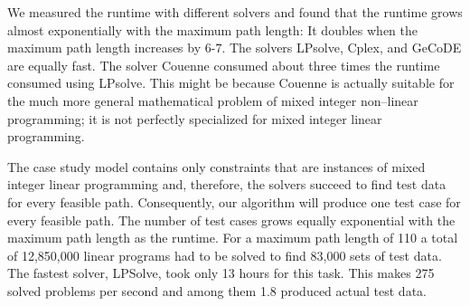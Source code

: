 \documentclass[runningheads,a4paper]{llncs}%
\begin{document}
We measured the runtime with different solvers and found that the runtime grows
almost exponentially with the maximum path length: It doubles when the
maximum path length increases by $6$-$7$. The solvers LPsolve, Cplex, and GeCoDE
are equally fast. The solver Couenne consumed about three times the runtime
consumed using LPsolve. This might be because Couenne is actually suitable for
the much more general mathematical problem of mixed integer non--linear
programming; it is not perfectly specialized for mixed integer linear
programming.

The case study model contains only constraints that are instances of mixed
integer linear programming and, therefore, the solvers succeed to find test data
for every feasible path. Consequently, our algorithm will produce one test case
for every feasible path. The number of test cases grows equally exponential with
the maximum path length as the runtime. For a maximum path length of 110 a total
of 12,850,000 linear programs had to be solved to find 83,000 sets of test data.
The fastest solver, LPSolve, took only 13 hours for this task. This makes 275
solved problems per second and among them 1.8 produced actual test data.
\end{document}
